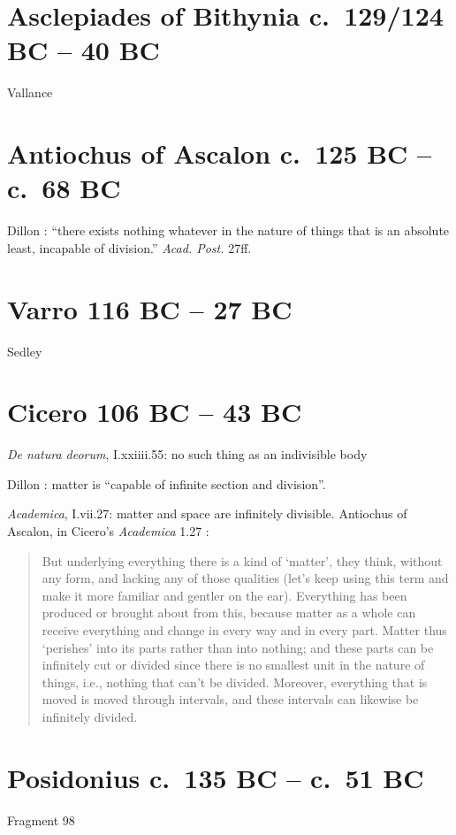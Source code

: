 \documentclass{amsart}
\theoremstyle{definition}
\begin{document}
\section{Asclepiades of Bithynia c.~129/124 BC -- 40 BC}
Vallance \cite{asclepiades}

\section{Antiochus of Ascalon c.~125 BC -- c.~68 BC}
Dillon \cite[p.~82]{dillon}: ``there exists nothing whatever in the nature of things that is an absolute least,
incapable of division.'' {\em Acad. Post.} 27ff.

\section{Varro 116 BC -- 27 BC}
Sedley \cite{stoicgod}

\section{Cicero 106 BC -- 43 BC}
{\em De natura deorum}, I.xxiiii.55: no such thing as an indivisible body

Dillon \cite[p.~170]{heirs}: matter is ``capable of infinite section and division''.

{\em Academica}, I.vii.27: matter and space are infinitely divisible. Antiochus of Ascalon, in Cicero's {\em Academica} 1.27 \cite[p.~98]{academica}:

\begin{quote}
But underlying everything there is a kind of `matter', they think, without any form, and lacking any of those qualities (let's keep using this term and make it more familiar and gentler
on the ear). Everything has been produced or brought about from this, because matter as a whole can receive everything and change in every way and in every part. Matter thus `perishes' into its parts rather than into nothing; and these parts can be infinitely cut or divided since there is no smallest unit in the nature of things, i.e., nothing that can't be
divided. Moreover, everything that is moved is moved through intervals, and these intervals can likewise be infinitely divided.
\end{quote}

\section{Posidonius c.~135 BC -- c.~51 BC}
Fragment 98 \cite[pp.~395--403]{kidd}
\end{document}
